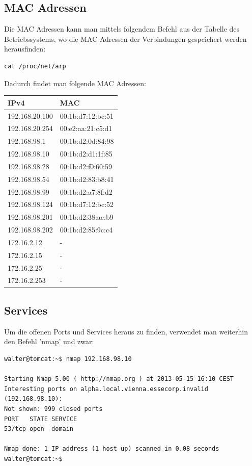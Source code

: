 \documentclass[12pt,a4paper,titlepage,oneside]{scrartcl}
\begin{document}
\newpage

\subsection{MAC Adressen}

Die MAC Adressen kann man mittels folgendem Befehl aus der Tabelle des Betriebssystems, wo die MAC Adressen der Verbindungen gespeichert werden herausfinden:

\begin{lstlisting}[caption=arp table Connections,style=simple]
cat /proc/net/arp
\end{lstlisting}

Dadurch findet man folgende MAC Adressen:

\begin{tabular}{ l | l }
\hline
IPv4 &	MAC \\ \hline
192.168.20.100 &	00:1b:d7:12:bc:51 \\ \hline
192.168.20.254 &	00:e2:aa:21:c5:d1 \\ \hline
192.168.98.1 & 	00:1b:d2:0d:84:98 \\ \hline
192.168.98.10 &	00:1b:d2:d1:1f:85 \\ \hline
192.168.98.28 &	00:1b:d2:f0:60:59 \\ \hline
192.168.98.54 &	00:1b:d2:83:b8:41 \\ \hline
192.168.98.99 &	00:1b:d2:a7:8f:d2 \\ \hline
192.168.98.124 &	00:1b:d7:12:bc:52 \\ \hline
192.168.98.201 &	00:1b:d2:38:ae:b9 \\ \hline
192.168.98.202 &	00:1b:d2:85:9c:c4 \\ \hline
172.16.2.12	 & - \\ \hline
172.16.2.15	 & - \\ \hline
172.16.2.25	 & - \\ \hline
172.16.2.253	 &-  \\ \hline
\end{tabular}

\newpage

\subsection{Services}
Um die offenen Ports und Services heraus zu finden, verwendet man weiterhin den Befehl 'nmap' und zwar:

\begin{lstlisting}[caption=nmap services and ports Connections,style=simple]
walter@tomcat:~$ nmap 192.168.98.10

Starting Nmap 5.00 ( http://nmap.org ) at 2013-05-15 16:10 CEST
Interesting ports on alpha.local.vienna.essecorp.invalid (192.168.98.10):
Not shown: 999 closed ports
PORT   STATE SERVICE
53/tcp open  domain

Nmap done: 1 IP address (1 host up) scanned in 0.08 seconds
walter@tomcat:~$ 
\end{lstlisting}
\end{document}

